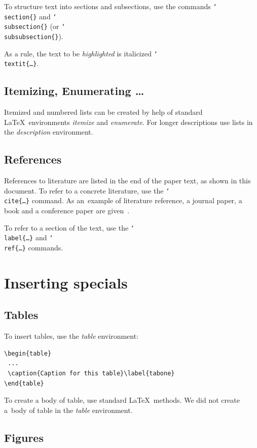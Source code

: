 \documentclass{cai}
\def\bs#1{{\tt\char`\\#1}}
\begin{document}
To structure text into sections and subsections, use the commands \bs{section\{\}} and \bs{subsection\{\}}
(or \bs{subsubsection\{\}}).

As a rule, the text to be \textit{highlighted} is italicized \bs{textit\{\dots\}}.


\subsection{Itemizing, Enumerating \dots}

Itemized and numbered lists can be created by help of standard \LaTeX\ environments \textit{itemize} and
\textit{enumerate}. For longer descriptions use lists in the \textit{description} environment.


\subsection{References}

References to literature are listed in the end of the paper text, as shown in this document. To refer to a
concrete literature, use the \bs{cite\{\dots\}} command. As an~example of literature reference, a journal
paper, a book and a conference paper are given~\cite{aklbruda, hintikka, marektruszczinski}.

To refer to a section of the text, use the \bs{label\{\dots\}} and \bs{ref\{\dots\}} commands.

\section{Inserting specials}

\subsection{Tables}

To insert tables, use the \textit{table} environment:

\begin{verbatim}
\begin{table}
 ...
 \caption{Caption for this table}\label{tabone}
\end{table}
\end{verbatim}

To create a body of table, use standard \LaTeX\ methods. We did not create a~body of table in the
\textit{table} environment.

\subsection{Figures}
\end{document}
